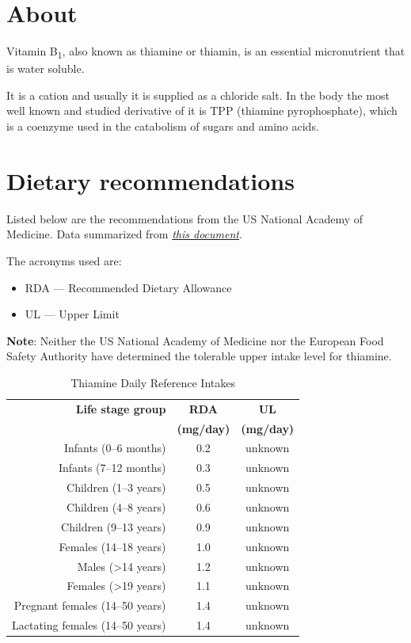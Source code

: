 \documentclass{book}
\begin{document}
\section{About}
Vitamin B\textsubscript{1}, also known as thiamine or thiamin, is an essential micronutrient that is water soluble.

It is a cation and usually it is supplied as a chloride salt. In the body the most well known and studied derivative of it is TPP (thiamine pyrophosphate), which is a coenzyme used in the catabolism of sugars and amino acids.

\section{Dietary recommendations}
Listed below are the recommendations from the US National Academy of Medicine. Data summarized from \href{https://nap.nationalacademies.org/read/6015/chapter/6}{\textit{this document}}.

The acronyms used are:
\begin{itemize}
	\item RDA --- Recommended Dietary Allowance
	\item UL --- Upper Limit
\end{itemize}

\textbf{Note}: Neither the US National Academy of Medicine nor the European Food Safety Authority have determined the tolerable upper intake level for thiamine.

\begin{table}[h]
	\caption{Thiamine Daily Reference Intakes}
	\centering \begin{tabular}{| r | c | c |}
		\hline
		\textbf{Life stage group} & \textbf{RDA} & \textbf{UL}\\ 
		& \textbf{(mg/day)} & \textbf{(mg/day)}\\ \hline
		Infants (0--6 months) & 0.2 & unknown\\ \hline
		Infants (7--12 months) & 0.3 & unknown\\ \hline
		Children (1--3 years) & 0.5 & unknown\\ \hline
		Children (4--8 years) & 0.6 & unknown\\ \hline
		Children (9--13 years) & 0.9 & unknown\\ \hline
		Females (14--18 years) & 1.0 & unknown\\ \hline
		Males (\textgreater14 years) & 1.2 & unknown\\ \hline
		Females (\textgreater19 years) & 1.1 & unknown\\ \hline
		Pregnant females (14--50 years) & 1.4 & unknown\\ \hline
		Lactating females (14--50 years) & 1.4 & unknown\\ \hline
	\end{tabular}
\end{table}
\newpage
\end{document}
